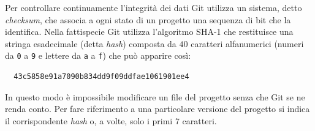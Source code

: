 \documentclass[a4paper,12pt,oneside]{article}
\begin{document}
Per controllare continuamente l'integrità dei dati Git utilizza un sistema, detto
\emph{checksum}, che associa a ogni stato di un progetto una sequenza di bit che
la identifica. Nella fattispecie Git utilizza l'algoritmo SHA-1 che restituisce
una stringa esadecimale (detta \emph{hash}) composta da $40$ caratteri
alfanumerici (numeri da \lstinline|0| a \lstinline|9| e lettere da \lstinline|a|
a \lstinline|f|) che può apparire così:
\begin{lstlisting}
  43c5858e91a7090b834dd9f09ddfae1061901ee4
\end{lstlisting}
In questo modo è impossibile modificare un file del progetto senza che Git se
ne renda conto. Per fare riferimento a una particolare versione del progetto
si indica il corrispondente \emph{hash} o, a volte, solo i primi $7$ caratteri.
\end{document}
